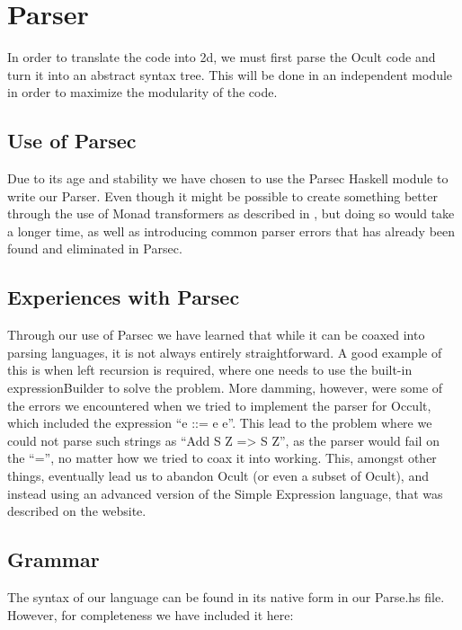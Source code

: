 \section{Parser}
In order to translate the code into 2d, we must first parse the Ocult code and turn it into an abstract syntax tree. This will be done in an independent module in order to maximize the modularity of the code.

\subsection{Use of Parsec}
Due to its age and stability we have chosen to use the Parsec Haskell module to write our Parser. Even though it might be possible to create something better through the use of Monad transformers as described in \cite{partial+parsing}, but doing so would take a longer time, as well as introducing common parser errors that has already been found and eliminated in Parsec.

\subsection{Experiences with Parsec}
Through our use of Parsec we have learned that while it can be coaxed into parsing languages, it is not always entirely straightforward. A good example of this is when left recursion is required, where one needs to use the built-in expressionBuilder to solve the problem. More damming, however, were some of the errors we encountered when we tried to implement the parser for Occult, which included the expression ``e ::= e e''. This lead to the problem where we could not parse such strings as ``Add S Z => S Z'', as the parser would fail on the ``='', no matter how we tried to coax it into working. This, amongst other things, eventually lead us to abandon Ocult (or even a subset of Ocult), and instead using an advanced version of the Simple Expression language, that was described on the website.

\subsection{}

\subsection{Grammar}
The syntax of our language can be found in its native form in our Parse.hs file. However, for completeness we have included it here:

